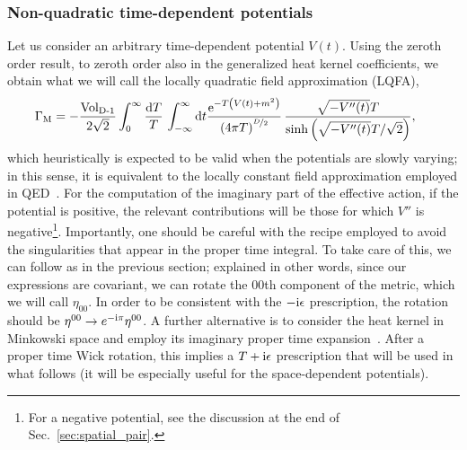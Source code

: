 \documentclass[12pt,a4paper]{article}
\numberwithin{equation}{section}
\numberwithin{equation}{section}
\newcommand{\mathi}{{\rm i}}
\begin{document}
\subsubsection{Non-quadratic time-dependent potentials}
Let us consider an arbitrary time-dependent potential $V(t)$. 
Using the zeroth order result, to zeroth order also in the generalized heat kernel coefficients, we obtain what we will call the locally quadratic field approximation (LQFA),
\begin{align}
    \begin{split}
    \label{eq:eff_time_inho}
\Gamma_{\rm M}
&= -\frac{ \operatorname{Vol_{\rm D-1}}}{2 \sqrt{2}} \int_0^{\infty} \frac{{\rm d}T}{T} \, \int_{-\infty}^{\infty} {\rm d}t\frac{\mathrm{e}^{-T \left(V(t)+m^2\right)}}{\left( 4\pi T \right)^{\nicefrac{D}{2}}} \,  \frac{\sqrt{-V''(t)}T}{ \sinh\left(\sqrt{-V''(t)} T/\sqrt{2}\right)}, \
\end{split}
\end{align}
which heuristically is expected to be valid when the potentials are slowly varying; in this sense, it is equivalent to the locally constant field approximation  employed in QED~\cite{Dunne:2006st, Fedotov:2022ely}. 
For the computation of the imaginary part of the effective action, if the potential is positive, the relevant contributions will be those for which $V''$ is negative\footnote{For a negative potential, see the discussion at the end of Sec.~\ref{sec:spatial_pair}.}.
Importantly, one should be careful with the recipe employed to avoid the singularities that appear in the proper time integral. 
 To take care of this, we can follow as in the previous section; explained in other words, since our expressions are covariant, we can rotate the $00$th component of the metric, which we will call  $\eta_{00}$.
In order to be consistent with the $-\mathi \epsilon$ prescription, the rotation should be $\eta^{00}\to e^{-\mathi \pi}\eta^{00}$.
A further alternative is to consider the   heat kernel in Minkowski space and employ its imaginary proper time expansion~\cite{DeWitt:2003pm}. After a proper time Wick rotation, this implies a $T+\mathi \epsilon$ prescription that will be used in what follows (it will be especially useful for the space-dependent potentials).
\end{document}
